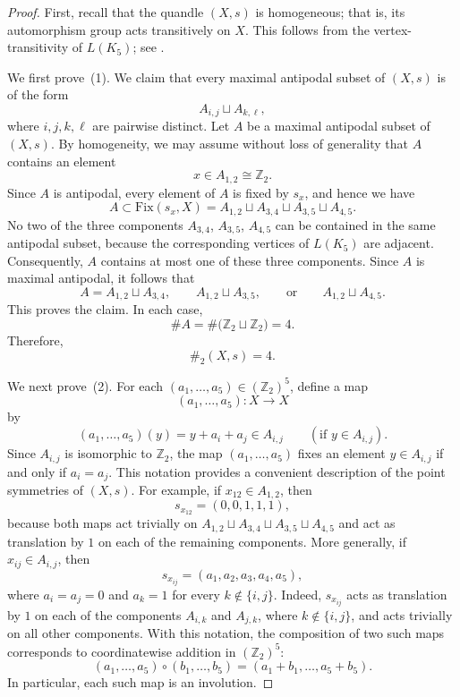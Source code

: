 \documentclass[12pt]{amsart}
\theoremstyle{definition}
\newcommand{\Z}{{\mathbb Z}}
\newcommand{\Fix}{\mathrm{Fix}}
\begin{document}
\begin{proof}
First, recall that the quandle $(X,s)$ is homogeneous; that is, its automorphism group acts transitively on $X$.
This follows from the vertex-transitivity of $L(K_5)$; see \cite{FT}.

We first prove~(1).
We claim that every maximal antipodal subset of $(X,s)$ is of the form
\[
A_{i,j}\sqcup A_{k,\ell},
\]
where $i,j,k,\ell$ are pairwise distinct.
Let $A$ be a maximal antipodal subset of $(X,s)$.
By homogeneity, we may assume without loss of generality that $A$ contains an element
\[
x\in A_{1,2}\cong\Z_2.
\]
Since $A$ is antipodal, every element of $A$ is fixed by $s_x$, and hence we have
\[
A\subset\Fix(s_x,X)
 =A_{1,2}\sqcup A_{3,4}\sqcup A_{3,5}\sqcup A_{4,5}.
\]
No two of the three components $A_{3,4}$, $A_{3,5}$, $A_{4,5}$ 
can be contained in the same antipodal subset, because the corresponding vertices of $L(K_5)$ are adjacent.
Consequently, $A$ contains at most one of these three components.
Since $A$ is maximal antipodal, it follows that
\[
A
 =A_{1,2}\sqcup A_{3,4},
 \qquad
A_{1,2}\sqcup A_{3,5},
 \qquad\text{or}\qquad
A_{1,2}\sqcup A_{4,5}.
\]
This proves the claim. 
In each case,
\[
\#A=\#\bigl(\Z_2\sqcup\Z_2\bigr)=4.
\]
Therefore,
\[
\#_2(X,s)=4.
\]

We next prove~(2).
For each $(a_1,\ldots,a_5) \in (\Z_2)^5$, define a map
\[
(a_1,\ldots,a_5) \colon X \longrightarrow X
\]
by
\[
(a_1,\ldots,a_5)(y) = y + a_i + a_j \in A_{i,j} 
\qquad 
(\mbox{if $y \in A_{i,j}$}) . 
\]
Since $A_{i,j}$ is isomorphic to $\Z_2$, the map
$(a_1,\ldots,a_5)$ fixes an element $y \in A_{i,j}$ if and only if
$a_i = a_j$.
This notation provides a convenient description of the point symmetries of $(X,s)$.
For example, if $x_{12} \in A_{1,2}$, then 
\[
s_{x_{12}} = (0,0,1,1,1),
\]
because both maps act trivially on
$A_{1,2} \sqcup A_{3,4} \sqcup A_{3,5} \sqcup A_{4,5}$ 
and act as translation by $1$ on each of the remaining components.
More generally, if $x_{ij} \in A_{i,j}$, then
\[
s_{x_{ij}} = (a_1,a_2,a_3,a_4,a_5),
\]
where $a_i = a_j = 0$ and $a_k = 1$ for every
$k \notin \{i,j\}$.
Indeed, $s_{x_{ij}}$ acts as translation by $1$ on each of the
components $A_{i,k}$ and $A_{j,k}$, where $k \notin \{i,j\}$,
and acts trivially on all other components. 
With this notation, the composition of two such maps corresponds to 
coordinatewise addition in $(\Z_2)^5$:
\[
(a_1,\ldots,a_5) \circ (b_1,\ldots,b_5)
=
(a_1+b_1,\ldots,a_5+b_5).
\]
In particular, each such map is an involution.




\end{proof}
\end{document}
